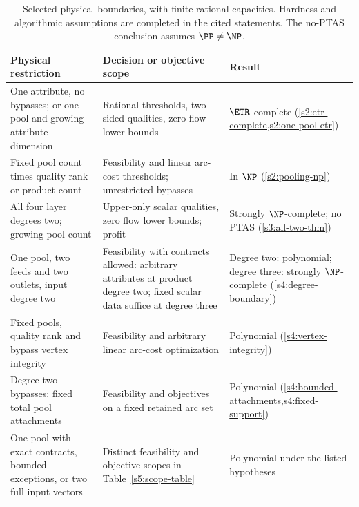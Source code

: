 \begin{table}[!t]
\centering
\small
\setlength{\tabcolsep}{4pt}
\begin{tabular}{@{}>{\raggedright\arraybackslash}p{.39\linewidth}>{\raggedright\arraybackslash}p{.36\linewidth}>{\raggedright\arraybackslash}p{.19\linewidth}@{}}
\toprule
Physical restriction & Decision or objective scope & Result\\
\midrule
One attribute, no bypasses; or one pool and growing attribute dimension
& Rational thresholds, two-sided qualities, zero flow lower bounds
& $\ETR$-complete (\cref{s2:etr-complete,s2:one-pool-etr})\\
\addlinespace
Fixed pool count times quality rank or product count
& Feasibility and linear arc-cost thresholds; unrestricted bypasses
& In $\NP$ (\cref{s2:pooling-np})\\
\addlinespace
All four layer degrees two; growing pool count
& Upper-only scalar qualities, zero flow lower bounds; profit
& Strongly $\NP$-complete; no PTAS (\cref{s3:all-two-thm})\\
\addlinespace
One pool, two feeds and two outlets, input degree two
& Feasibility with contracts allowed: arbitrary attributes at product
degree two; fixed scalar data suffice at degree three
& Degree two: polynomial; degree three: strongly $\NP$-complete
(\cref{s4:degree-boundary})\\
\addlinespace
Fixed pools, quality rank and bypass vertex integrity
& Feasibility and arbitrary linear arc-cost optimization
& Polynomial (\cref{s4:vertex-integrity})\\
\addlinespace
Degree-two bypasses; fixed total pool attachments
& Feasibility and objectives on a fixed retained arc set
& Polynomial (\cref{s4:bounded-attachments,s4:fixed-support})\\
\addlinespace
One pool with exact contracts, bounded exceptions, or two full input vectors
& Distinct feasibility and objective scopes in Table~\ref{s5:scope-table}
& Polynomial under the listed hypotheses\\
\bottomrule
\end{tabular}
\caption{Selected physical boundaries, with finite rational capacities.
Hardness and algorithmic assumptions are completed in the cited statements.
The no-PTAS conclusion assumes $\PP\ne\NP$.}
\label{s0:boundaries}
\end{table}

